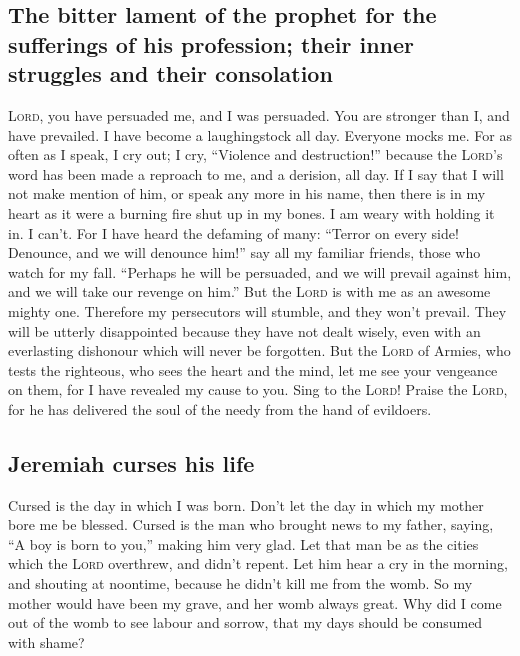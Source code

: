 \hypertarget{the-bitter-lament-of-the-prophet-for-the-sufferings-of-his-profession-their-inner-struggles-and-their-consolation}{%
\subsection{The bitter lament of the prophet for the sufferings of his
profession; their inner struggles and their
consolation}\label{the-bitter-lament-of-the-prophet-for-the-sufferings-of-his-profession-their-inner-struggles-and-their-consolation}}

 \textsc{Lord}, you have persuaded me, and I was
persuaded. You are stronger than I, and have prevailed. I have become a
laughingstock all day. Everyone mocks me.  For as often as
I speak, I cry out; I cry, ``Violence and destruction!'' because the
\textsc{Lord}'s word has been made a reproach to me, and a derision, all
day.  If I say that I will not make mention of him, or
speak any more in his name, then there is in my heart as it were a
burning fire shut up in my bones. I am weary with holding it in. I
can't.  For I have heard the defaming of many: ``Terror
on every side! Denounce, and we will denounce him!'' say all my familiar
friends, those who watch for my fall. ``Perhaps he will be persuaded,
and we will prevail against him, and we will take our revenge on him.''
 But the \textsc{Lord} is with me as an awesome mighty
one. Therefore my persecutors will stumble, and they won't prevail. They
will be utterly disappointed because they have not dealt wisely, even
with an everlasting dishonour which will never be forgotten.
 But the \textsc{Lord} of Armies, who tests the
righteous, who sees the heart and the mind, let me see your vengeance on
them, for I have revealed my cause to you.  Sing to the
\textsc{Lord}! Praise the \textsc{Lord}, for he has delivered the soul
of the needy from the hand of evildoers.

\hypertarget{jeremiah-curses-his-life}{%
\subsection{Jeremiah curses his life}\label{jeremiah-curses-his-life}}

 Cursed is the day in which I was born. Don't let the day
in which my mother bore me be blessed.  Cursed is the man
who brought news to my father, saying, ``A boy is born to you,'' making
him very glad.  Let that man be as the cities which the
\textsc{Lord} overthrew, and didn't repent. Let him hear a cry in the
morning, and shouting at noontime,  because he didn't
kill me from the womb. So my mother would have been my grave, and her
womb always great.  Why did I come out of the womb to see
labour and sorrow, that my days should be consumed with shame?

